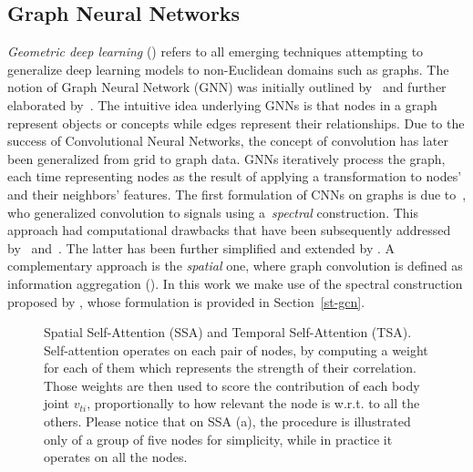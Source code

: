 \documentclass[times,twocolumn,final,authoryear]{elsarticle}
\begin{document}
\subsection{Graph Neural Networks} 
\textit{Geometric deep learning} (\cite{DBLP:journals/corr/BronsteinBLSV16}) refers to all emerging techniques attempting to generalize deep learning models to non-Euclidean domains such as graphs. The notion of Graph Neural Network (GNN) was initially outlined by~\cite{Gori2005ANM} and further elaborated by~\cite{Scarselli2009TheGN}. The intuitive idea underlying GNNs is that nodes in a graph represent objects or concepts while edges represent their relationships. Due to the success of Convolutional Neural Networks, the concept of convolution has later been generalized from grid to graph data. GNNs iteratively process the graph, each time representing nodes as the result of applying a transformation to nodes' and their neighbors' features. The first formulation of CNNs on graphs is due to~\cite{ae482107de73461787258f805cf8f4ed}, who generalized convolution to signals using a~\textit{spectral} construction. This approach had computational drawbacks that have been subsequently addressed by~\cite{DBLP:journals/corr/HenaffBL15} and~\cite{DBLP:journals/corr/DefferrardBV16}. The latter has been further simpliﬁed and extended by \cite{Kipf:2016tc}. A complementary approach is the \textit{spatial} one, where graph convolution is defined as information aggregation (\cite{article7,DBLP:journals/corr/NiepertAK16,DBLP:journals/corr/SuchSDPZMCP17}). In this work we make use of the spectral construction proposed by \cite{Kipf:2016tc}, whose formulation is provided in Section~\ref{st-gcn}.
\begin{figure*}[t]
\centering
{}
\hspace{1cm}
\caption{{Spatial Self-Attention (SSA)} and {Temporal Self-Attention (TSA)}. Self-attention operates on each pair of nodes, by computing a weight for each of them which represents the strength of their correlation. Those weights are then used to score the contribution of each body joint $v_{ti}$, proportionally to how relevant the node is w.r.t. to all the others. Please notice that on SSA (a), the procedure is illustrated only of a group of five nodes for simplicity, while in practice it operates on all the nodes.}
\label{SSA_TSA}
\end{figure*}
\end{document}
